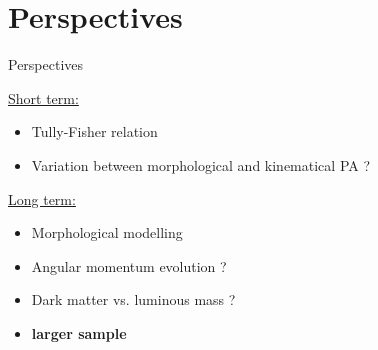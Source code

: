 \documentclass[usenames,dvipsnames]{beamer}
\begin{document}
\section{Perspectives}
\begin{frame}{Perspectives}

	\underline{Short term:}

	\begin{itemize}[label=$\rhd$]
		\item Tully-Fisher relation
		\item Variation between morphological and kinematical PA ?
	\end{itemize}

\underline{Long term:}

	\begin{itemize}[label=$\rhd$]
		\item Morphological modelling
		\item Angular momentum evolution ?
		\item Dark matter vs. luminous mass ?
		\item \textbf{larger sample}
	\end{itemize}

\end{frame}
\end{document}
